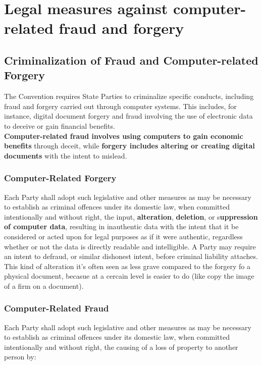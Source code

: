 \section{Legal measures against computer-related fraud and forgery}

\subsection{Criminalization of Fraud and Computer-related Forgery}

The Convention requires State Parties to criminalize specific conducts, including fraud and forgery carried out through computer systems. This includes, for instance, digital document forgery and fraud involving the use of electronic data to deceive or gain financial benefits. \\\textbf{Computer-related fraud involves using computers to gain economic benefits} through deceit, while \textbf{forgery includes altering or creating digital documents} with the intent to mislead. 


\subsubsection{Computer-Related Forgery}
Each Party shall adopt such legislative and other measures as may be necessary to establish as criminal offences under its domestic law, when committed intentionally and without right, the input, \textbf{alteration}, \textbf{deletion}, or s\textbf{uppression of computer data}, resulting in inauthentic data with the intent that it be considered or acted upon for legal purposes as if it were authentic, regardless whether or not the data is directly readable and intelligible. A Party may require an intent to defraud, or similar dishonest intent, before criminal liability attaches. \\
This kind of alteration it's often seen as less grave compared to the forgery fo a physical document, becasue at a cercain level is easier to do (like copy the image of a firm on a document).

\subsubsection{Computer-Related Fraud}

Each Party shall adopt such legislative and other measures as may be necessary to establish as criminal offences under its domestic law, when committed intentionally and without right, the causing of a loss of property to another person by:

